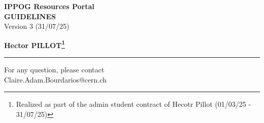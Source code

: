 \documentclass[a4paper,11pt]{book}
\begin{document}
\AddToShipoutPictureBG*{}
\clearpage

\begin{titlepage}
    \centering
    \vspace{1cm}
    \begin{figure}[h!]
        \centering
        
    \end{figure}
    \Huge\textbf{IPPOG Resources Portal\\GUIDELINES}
    \vspace{1cm}\\
    {Version 3 (31/07/25)}\par
    \vspace{2cm}
    {\Large\textbf{Hector PILLOT\footnote{Realized as part of the admin student contract of Hecotr Pillot (01/03/25 - 31/07/25)}}}\par
    \begin{center}
        \rule{0.5\linewidth}{1pt}
    \end{center}
    \normalsize
    For any question, please contact\\Claire.Adam.Bourdarios@cern.ch\\
    \vspace{2cm}
    \vfill 
    \centering
    \vspace{1cm}
\end{titlepage}

\AddToShipoutPictureBG{}
\clearpage

\tableofcontents

\newpage







\end{document}
